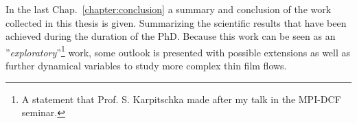 In the last Chap.~\ref{chapter:conclusion} a summary and conclusion of the work collected in this thesis is given.
Summarizing the scientific results that have been achieved during the duration of the PhD.
Because this work can be seen as an ''\textit{exploratory}''\footnote{A statement that Prof. S. Karpitschka made after my talk in the MPI-DCF seminar.} work, some outlook is presented with possible extensions as well as further dynamical variables to study more complex thin film flows. 